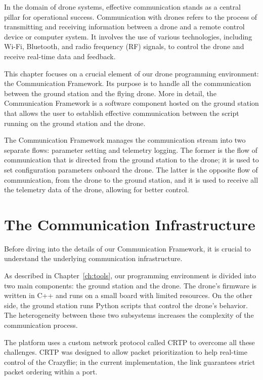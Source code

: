 In the domain of drone systems, effective communication stands as a central pillar for operational success.
Communication with drones refers to the process of transmitting and receiving information between a drone and a remote control device or computer system. 
It involves the use of various technologies, including Wi-Fi, Bluetooth, and radio frequency (RF) signals, to control the drone and receive real-time data and feedback.

This chapter focuses on a crucial element of our drone programming environment: the Communication Framework. 
Its purpose is to handle all the communication between the ground station and the flying drone. 
More in detail, the Communication Framework is a software component hosted on the ground station 
that allows the user to establish effective communication between the script running on the ground station and the drone.

The Communication Framework manages the communication stream into two separate flows: parameter setting and telemetry logging.
The former is the flow of communication that is directed from the ground station to the drone; it is used to set configuration parameters onboard the drone.
The latter is the opposite flow of communication, from the drone to the ground station, and it is used to receive all the telemetry data of the drone, allowing for better control.

\section{The Communication Infrastructure}\label{sec:communication_infrastructure}
Before diving into the details of our Communication Framework, it is crucial to understand the underlying communication infrastructure. 

As described in Chapter~\ref{ch:tools}, our programming environment is divided into two main components: the ground station and the drone.
The drone's firmware is written in C++ and runs on a small board with limited resources. On the other side, the ground station runs Python scripts
that control the drone's behavior. The heterogeneity between these two subsystems increases the complexity of the communication process.

The platform uses a custom network protocol called CRTP to overcome all these challenges. 
CRTP was designed to allow packet prioritization to help real-time control of the Crazyflie; in the current implementation, the link guarantees strict packet ordering within a port.

